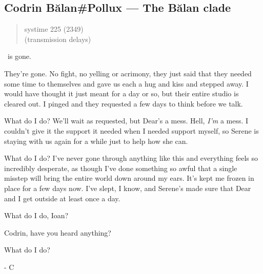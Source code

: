 \hypertarget{codrin-bux103lanpollux-the-bux103lan-clade}{%
\subsection{Codrin Bălan\#Pollux — The Bălan clade}\label{codrin-bux103lanpollux-the-bux103lan-clade}}

\begin{quote}
systime 225 (2349)\\
(transmission delays)
\end{quote}

\Partner \ is gone.

They're gone. No fight, no yelling or acrimony, they just said that they needed some time to themselves and gave us each a hug and kiss and stepped away. I would have thought it just meant for a day or so, but their entire studio is cleared out. I pinged and they requested a few days to think before we talk.

What do I do? We'll wait as requested, but Dear's a mess. Hell, \emph{I'm} a mess. I couldn't give it the support it needed when I needed support myself, so Serene is staying with us again for a while just to help how she can.

What do I do? I've never gone through anything like this and everything feels so incredibly desperate, as though I've done something so awful that a single misstep will bring the entire world down around my ears. It's kept me frozen in place for a few days now. I've slept, I know, and Serene's made sure that Dear and I get outside at least once a day.

What do I do, Ioan?

Codrin, have you heard anything?

What do I do?

- C
